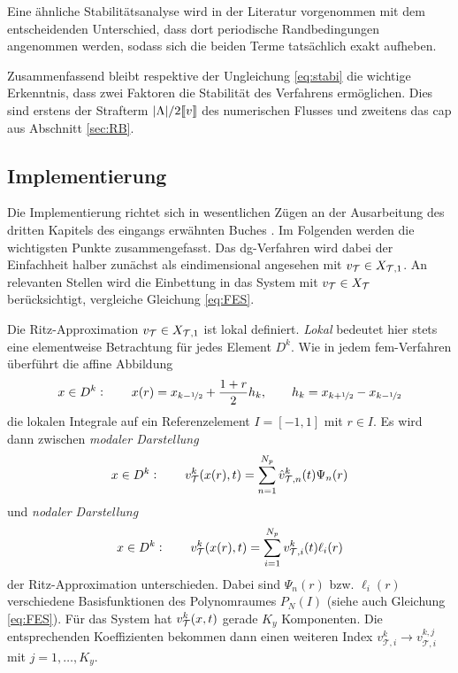 Eine ähnliche Stabilitätsanalyse wird in der Literatur \cite{NLS} vorgenommen mit dem entscheidenden Unterschied, dass dort periodische Randbedingungen angenommen werden, sodass sich die beiden Terme tatsächlich exakt aufheben.

Zusammenfassend bleibt respektive der Ungleichung \eqref{eq:stabi} die wichtige Erkenntnis, dass zwei Faktoren die Stabilität des Verfahrens ermöglichen. Dies sind erstens der Strafterm $|\Lambda|/2\llbracket v \rrbracket$ des numerischen Flusses und zweitens das \ac{cap} aus Abschnitt \ref{sec:RB}.

\subsection{Implementierung}
Die Implementierung richtet sich in wesentlichen Zügen an der Ausarbeitung des dritten Kapitels des eingangs erwähnten Buches \cite{buch}. Im Folgenden werden die wichtigsten Punkte zusammengefasst. Das \ac{dg}-Verfahren wird dabei der Einfachheit halber zunächst als eindimensional angesehen mit $v_{\mathcal{T}} \in X_{\mathcal{T},1}$. An relevanten Stellen wird die Einbettung in das System mit $v_{\mathcal{T}} \in X_{\mathcal{T}}$ berücksichtigt, vergleiche Gleichung \eqref{eq:FES}.

Die Ritz-Approximation $v_{\mathcal{T}} \in X_{\mathcal{T},1}$ ist lokal definiert. \emph{Lokal} bedeutet hier stets eine elementweise Betrachtung für jedes Element $D^k$. Wie in jedem \ac{fem}-Verfahren überführt die affine Abbildung
\begin{equation}
  x\in D^k : \qquad x(r) = x_{k-\nicefrac{1}{2}} + \frac{1+r}{2}h_k, \qquad h_k=x_{k+\nicefrac{1}{2}} - x_{k-\nicefrac{1}{2}}
  \label{eq:affmap}
\end{equation}
die lokalen Integrale auf ein Referenzelement $I=[-1,1]$ mit $r\in I$.
Es wird dann zwischen \emph{modaler Darstellung}
\begin{align}
  x\in D^k : \qquad v_{\mathcal{T}}^k(x(r),t) = \sum_{n=1}^{N_p}\hat{v}_{\mathcal{T},n}^k(t) \Psi_n(r)
\end{align}
und \emph{nodaler Darstellung}
\begin{align}
  x\in D^k : \qquad v_{\mathcal{T}}^k(x(r),t) = \sum_{i=1}^{N_p} v_{\mathcal{T},i}^k(t)\ell_i(r)
  \label{eq:nodal}
\end{align}
der Ritz-Approximation unterschieden. Dabei sind $\Psi_n(r)$ bzw. $\ell_i(r)$ verschiedene Basisfunktionen des Polynomraumes $P_N(I)$ (siehe auch Gleichung \eqref{eq:FES}). Für das System hat $v_{\mathcal{T}}^k(x,t)$ gerade $K_y$ Komponenten. Die entsprechenden Koeffizienten bekommen dann einen weiteren Index $v_{\mathcal{T},i}^k \rightarrow v_{\mathcal{T},i}^{k,j}$ mit $j=1,\dots,K_y$.

